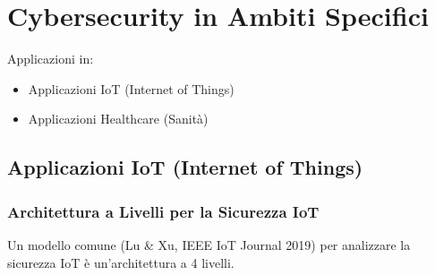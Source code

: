 \documentclass{article}
\begin{document}
\section{Cybersecurity in Ambiti Specifici}
Applicazioni in:
\begin{itemize}
    \item Applicazioni IoT (Internet of Things)
    \item Applicazioni Healthcare (Sanità)
\end{itemize}

\subsection{Applicazioni IoT (Internet of Things)}

\subsubsection{Architettura a Livelli per la Sicurezza IoT}
Un modello comune (Lu \& Xu, IEEE IoT Journal 2019) per analizzare la sicurezza IoT è un'architettura a 4 livelli.
\end{document}
